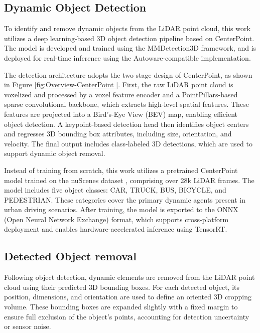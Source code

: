\subsection{Dynamic Object Detection}

To identify and remove dynamic objects from the LiDAR point cloud, this work utilizes a deep learning-based 3D object detection pipeline based on CenterPoint\cite{yin2021center}. The model is developed and trained using the MMDetection3D framework\cite{mmdet3d2020}, and is deployed for real-time inference using the Autoware-compatible implementation\cite{autoware_universe}.

The detection architecture adopts the two-stage design of CenterPoint, as shown in Figure \ref{fig:Overview-CenterPoint }. First, the raw LiDAR point cloud is voxelized and processed by a voxel feature encoder and a PointPillars-based sparse convolutional backbone\cite{lang2019pointpillars}, which extracts high-level spatial features. These features are projected into a Bird’s-Eye View (BEV) map, enabling efficient object detection. A keypoint-based detection head then identifies object centers and regresses 3D bounding box attributes, including size, orientation, and velocity. The final output includes class-labeled 3D detections, which are used to support dynamic object removal.

Instead of training from scratch, this work utilizes a pretrained CenterPoint model trained on the nuScenes dataset \cite{caesar2020nuscenes}, comprising over 28k LiDAR frames. The model includes five object classes: CAR, TRUCK, BUS, BICYCLE, and PEDESTRIAN. These categories cover the primary dynamic agents present in urban driving scenarios. After training, the model is exported to the ONNX (Open Neural Network Exchange) format, which supports cross-platform deployment and enables hardware-accelerated inference using TensorRT.




\subsection{Detected Object removal }


Following object detection, dynamic elements are removed from the LiDAR point cloud using their predicted 3D bounding boxes. For each detected object, its position, dimensions, and orientation are used to define an oriented 3D cropping volume. These bounding boxes are expanded slightly with a fixed margin to ensure full exclusion of the object’s points, accounting for detection uncertainty or sensor noise.


